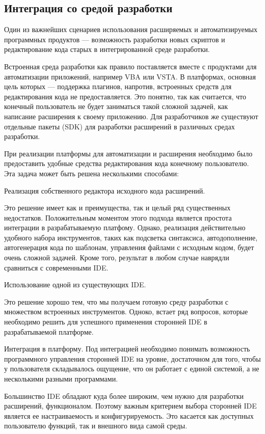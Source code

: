 \subsection{Интеграция со средой разработки}

Один из важнейших сценариев использования расширяемых и автоматизируемых программных продуктов --- возможность разработки новых скриптов и редактирование кода старых в интегрированной среде разработки.

Встроенная среда разработки как правило поставляется вместе с продуктами для автоматизации приложений, например VBA или VSTA. В платформах, основная цель которых --- поддержка плагинов, напротив, встроенных средств для редактирования кода не предоставляется. Это понятно, так как считается, что конечный пользователь не будет заниматься такой сложной задачей, как написание расширения к своему приложению. Для разработчиков же существуют отдельные пакеты (SDK) для разработки расширений в различных средах разработки.

При реализации платформы для автоматизации и расширения необходимо было предоставить удобные средства редактирования кода конечному пользователю. Эта задача может быть решена несколькими способами:

Реализация собственного редактора исходного кода расширений.

Это решение имеет как и преимущества, так и целый ряд существенных недостатков. Положительным моментом этого подхода является простота интеграции в разрабатываемую платфому. Однако, реализация действительно удобного набора инструментов, таких как подсветка синтаксиса, автодополнение, автогенерация кода по шаблонам, управления файлами с исходным кодом, будет очень сложной задачей. Кроме того, результат в любом случае наврядли сравниться с современными IDE.

Использование одной из существующих IDE.

Это решение хорошо тем, что мы получаем готовую среду разработки с множеством встроенных инструментов. Одноко, встает ряд вопросов, которые необходимо решить для успешного применения сторонней IDE в разрабатываемой платформе.

Интеграция в платформу. Под интеграцией необходимо понимать возможность программного управления сторонней IDE на уровне, достаточном для того, чтобы у пользователя складывалось ощущение, что он работает с единой системой, а не несколькими разными программами.

Большинство IDE обладают куда более широким, чем нужно для разработки расширений, функционалом. Поэтому важным критерием выбора сторонней IDE является ее настраиваемость и конфигурируемость. Это касается как доступных пользователю функций, так и внешного вида самой среды.

